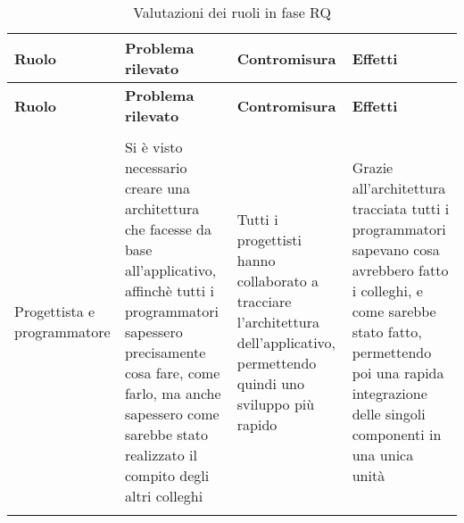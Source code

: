 \documentclass[../piano_di_qualifica.tex]{subfiles}
\begin{document}
\begin{center}
	\begin{longtable}{|p{2.5cm}|p{4.5cm}|p{4.5cm}|p{4.5cm}|}
		\hline
		\rowcolor{lightgray}
		{\textbf{Ruolo}} & {\textbf{Problema rilevato}} & {\textbf{Contromisura}} & {\textbf{Effetti}}  \\
		\hline
		\endfirsthead
		\hline
		\rowcolor{lightgray}
		{\textbf{Ruolo}} & {\textbf{Problema rilevato}} & {\textbf{Contromisura}} & {\textbf{Effetti}} \\
		\hline
		\endhead

		\hline
		\rowcolor{white}
		\multicolumn{3}{|c|}{\emph{Continua alla pagina successiva...}} \\
		\hline
		\endfoot
		\endlastfoot

		Progettista e programmatore & Si è visto necessario creare una architettura che facesse da base all’applicativo, affinchè tutti i programmatori sapessero precisamente cosa fare, come farlo, ma anche sapessero come sarebbe stato realizzato il compito degli altri colleghi & Tutti i progettisti hanno collaborato a tracciare l’architettura dell’applicativo, permettendo quindi uno sviluppo più rapido & Grazie all’architettura tracciata tutti i programmatori sapevano cosa avrebbero fatto i colleghi, e  come sarebbe stato fatto, permettendo poi una rapida integrazione delle singoli componenti in una unica unità  \\

		\hline
		\rowcolor{white}
		\caption{Valutazioni dei ruoli in fase RQ}
	\end{longtable}
\end{center}
\end{document}
